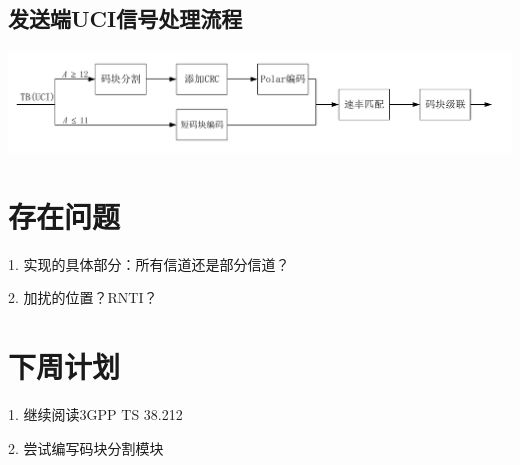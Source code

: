 \documentclass{article}
\begin{document}
\subsection{发送端UCI信号处理流程}
\includegraphics[width = \textwidth]{Tx_UCI_flow.pdf}

\section{存在问题}
1. 实现的具体部分：所有信道还是部分信道？

2. 加扰的位置？RNTI？

\section{下周计划}
1. 继续阅读3GPP TS 38.212

2. 尝试编写码块分割模块
\end{document}

